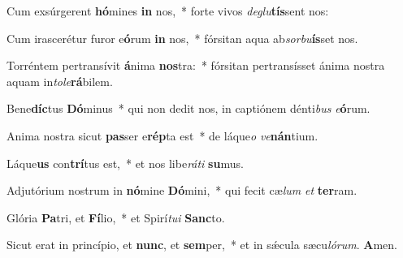 Cum exsúrgerent \textbf{hó}mines \textbf{in} nos,~* forte vivos \textit{de}\textit{glu}\textbf{tís}sent nos:

Cum irascerétur furor e\textbf{ó}rum \textbf{in} nos,~* fórsitan aqua ab\textit{sor}\textit{bu}\textbf{ís}set nos.

Torréntem pertransívit \textbf{á}nima \textbf{nos}tra:~* fórsitan pertransísset ánima nostra aquam in\textit{to}\textit{le}\textbf{rá}bilem.

Bene\textbf{díc}tus \textbf{Dó}minus~* qui non dedit nos, in captiónem dénti\textit{bus} \textit{e}\textbf{ó}rum.

Anima nostra sicut \textbf{pas}ser e\textbf{rép}ta est~* de láque\textit{o} \textit{ve}\textbf{nán}tium.

Láque\textbf{us} con\textbf{trí}tus est,~* et nos libe\textit{rá}\textit{ti} \textbf{su}mus.

Adjutórium nostrum in \textbf{nó}mine \textbf{Dó}mini,~* qui fecit cæ\textit{lum} \textit{et} \textbf{ter}ram.

Glória \textbf{Pa}tri, et \textbf{Fí}lio,~* et Spirí\textit{tu}\textit{i} \textbf{Sanc}to.

Sicut erat in princípio, et \textbf{nunc}, et \textbf{sem}per,~* et in sǽcula sæcu\textit{ló}\textit{rum}. \textbf{A}men.

